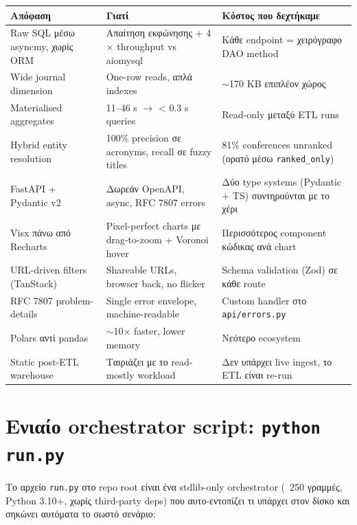 \begin{center}
\begin{tabular}{@{}p{} p{} p{}@{}}
\toprule
\textbf{Απόφαση} & \textbf{Γιατί} & \textbf{Κόστος που δεχτήκαμε} \\
\midrule
Raw SQL μέσω asyncmy, χωρίς ORM
& Απαίτηση εκφώνησης + 4$\times$ throughput vs aiomysql
& Κάθε endpoint = χειρόγραφο DAO method \\
\addlinespace
Wide journal dimension
& One-row reads, απλά indexes
& $\sim$170 KB επιπλέον χώρος \\
\addlinespace
Materialised aggregates
& 11--46 s $\rightarrow$ < 0.3 s queries
& Read-only μεταξύ ETL runs \\
\addlinespace
Hybrid entity resolution
& 100\% precision σε acronyms, recall σε fuzzy titles
& 81\% conferences unranked (ορατό μέσω \texttt{ranked\_only}) \\
\addlinespace
FastAPI + Pydantic v2
& Δωρεάν OpenAPI, async, RFC 7807 errors
& Δύο type systems (Pydantic + TS) συντηρούνται με το χέρι \\
\addlinespace
Visx πάνω από Recharts
& Pixel-perfect charts με drag-to-zoom + Voronoi hover
& Περισσότερος component κώδικας ανά chart \\
\addlinespace
URL-driven filters (TanStack)
& Shareable URLs, browser back, no flicker
& Schema validation (Zod) σε κάθε route \\
\addlinespace
RFC 7807 problem-details
& Single error envelope, machine-readable
& Custom handler στο \texttt{api/errors.py} \\
\addlinespace
Polars αντί pandas
& $\sim$10$\times$ faster, lower memory
& Νεότερο ecosystem \\
\addlinespace
Static post-ETL warehouse
& Ταιριάζει με το read-mostly workload
& Δεν υπάρχει live ingest, το ETL είναι re-run \\
\bottomrule
\end{tabular}
\end{center}

\section{Ενιαίο orchestrator script: \texttt{python run.py}}

Το αρχείο \texttt{run.py} στο repo root είναι ένα stdlib-only
orchestrator (~250 γραμμές, Python 3.10+, χωρίς third-party deps)
που αυτο-εντοπίζει τι υπάρχει στον δίσκο και σηκώνει αυτόματα το
σωστό σενάριο:

